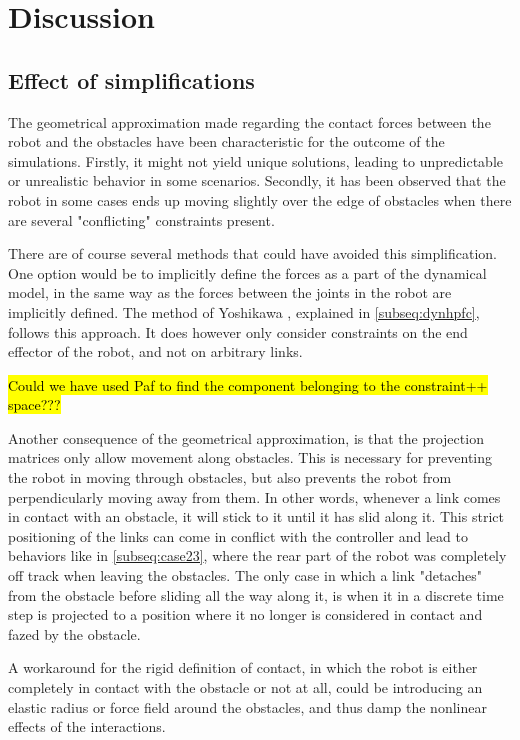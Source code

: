 \chapter{Discussion} \label{ch:discussion}

\section{Effect of simplifications}

The geometrical approximation made regarding the contact forces between the robot and the obstacles have been characteristic for the outcome of the simulations. Firstly, it might not yield unique solutions, leading to unpredictable or unrealistic behavior in some scenarios. Secondly, it has been observed that the robot in some cases ends up moving slightly over the edge of obstacles when there are several "conflicting" constraints present.

There are of course several methods that could have avoided this simplification.
One option would be to implicitly define the forces as a part of the dynamical model, in the same way as the forces between the joints in the robot are implicitly defined. The method of Yoshikawa \cite{yoshikawa1987dynamic}, explained in \ref{subseq:dynhpfc}, follows this approach. It does however only consider constraints on the end effector of the robot, and not on arbitrary links.

\hl{Could we have used Paf to find the component belonging to the constraint++ space???}

Another consequence of the geometrical approximation, is that the projection matrices only allow movement along obstacles. This is necessary for preventing the robot in moving through obstacles, but also prevents the robot from perpendicularly moving away from them. In other words, whenever a link comes in contact with an obstacle, it will stick to it until it has slid along it. This strict positioning of the links can come in conflict with the controller and lead to behaviors like in \ref{subseq:case23}, where the rear part of the robot was completely off track when leaving the obstacles. The only case in which a link "detaches" from the obstacle before sliding all the way along it, is when it in a discrete time step is projected to a position where it no longer is considered in contact and fazed by the obstacle. 

A workaround for the rigid definition of contact, in which the robot is either completely in contact with the obstacle or not at all, could be introducing an elastic radius or force field around the obstacles, and thus damp the nonlinear effects of the interactions. %


